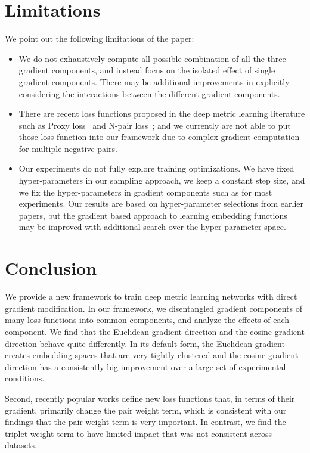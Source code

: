 \documentclass[10pt,twocolumn,letterpaper]{article}
\begin{document}
\section{Limitations}
We point out the following limitations of the paper:
\begin{itemize}
    \item We do not exhaustively compute all possible combination of all the three gradient components, and instead focus on the isolated effect of single gradient components.  There may be additional improvements in explicitly considering the interactions between the different gradient components.
    \item  There are recent loss functions proposed in the deep metric learning literature such as Proxy loss~\cite{Proxy} and N-pair loss~\cite{Npairs}; and we currently are not able to put those loss function into our framework due to complex gradient computation for multiple negative pairs. 
\item Our experiments do not fully explore training optimizations.  We have fixed hyper-parameters in our sampling approach, we keep a constant step size, and we fix the hyper-parameters in gradient components such as  for most experiments. Our results are based on hyper-parameter selections from earlier papers, but the gradient based approach to learning embedding functions may be improved with additional search over the hyper-parameter space.
\end{itemize}


\section{Conclusion}
We provide a new framework to train deep metric learning networks with direct gradient modification. In our framework, we disentangled gradient components of many loss functions into common components, and analyze the effects of each component.  We find that the Euclidean gradient direction and the cosine gradient direction behave quite differently. In its default form, the Euclidean gradient creates embedding spaces that are very tightly clustered and the cosine gradient direction has a consistently big improvement over a large set of experimental conditions. 

Second, recently popular works define new loss functions that, in terms of their gradient, primarily change the pair weight term, which is consistent with our findings that the pair-weight term is very important.  In contrast, we find the triplet weight term to have limited impact that was not consistent across datasets.  
\end{document}
